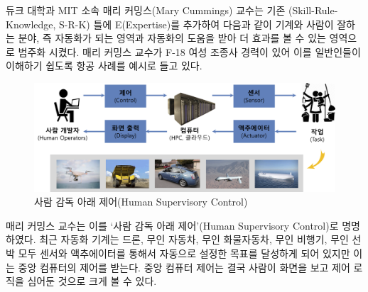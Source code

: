 \documentclass[smallextended]{svjour3}       %
\begin{document}
듀크 대학과 MIT 소속 매리 커밍스(Mary Cummings) 교수는 기존
(Skill-Rule-Knowledge, S-R-K) 틀에 E(Expertise)를 추가하여 다음과 같이
기계와 사람이 잘하는 분야, 즉 자동화가 되는 영역과 자동화의 도움을 받아
더 효과를 볼 수 있는 영역으로 범주화 시켰다. 매리 커밍스 교수가 F-18
여성 조종사 경력이 있어 이를 일반인들이 이해하기 쉽도록 항공 사례를
예시로 들고 있다.

\begin{figure}

{\centering \includegraphics[width=0.77\linewidth]{fig/human-supervisory-control} 

}

\caption{사람 감독 아래 제어(Human Supervisory Control)}\label{fig:unnamed-chunk-6}
\end{figure}

매리 커밍스 교수는 이를 `사람 감독 아래 제어'(Human Supervisory
Control)로 명명하였다. 최근 자동화 기계는 드론, 무인 자동차, 무인
화물자동차, 무인 비행기, 무인 선박 모두 센서와 액추에이터를 통해서
자동으로 설정한 목표를 달성하게 되어 있지만 이는 중앙 컴퓨터의 제어를
받는다. 중앙 컴퓨터 제어는 결국 사람이 화면을 보고 제어 로직을 심어둔
것으로 크게 볼 수 있다.

\begin{table}[H]
\centering
{}
\end{table}
\end{document}
